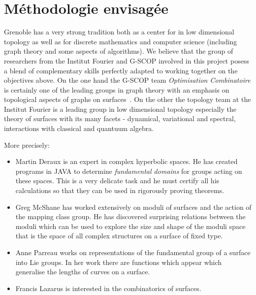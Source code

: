 \documentclass[14pt,fleqn]{article}
\begin{document}
\section{Méthodologie envisagée}

Grenoble  has 
a very strong tradition both 
as a center for in low dimensional topology 
as well as for discrete mathematics and computer science
(including graph theory and some aspects of algorithms). 
We believe that the group of researchers from the Institut Fourier and G-SCOP 
involved
in this project posess a blend of complementary skills 
perfectly adapted
to working together on the objectives above.
On the one hand the G-SCOP team \emph{Optimisation Combinatoire} is certainly one of the leading groups in graph theory with an emphasis on topological aspects of graphs on surfaces~\cite{es-wqpp-18}. On the other the topology team at the Institut Fourier is a leading group in low dimensional topology 
especially the theory of surfaces 
with its many facets 
- dynamical, variational and spectral,
 interactions with classical and quantuum algebra.
 
More precisely:
\begin{itemize}
\item Martin Deraux is an expert in complex hyperbolic spaces. He has created programs in JAVA to determine 
\textit{fundamental domains} for groups acting on these spaces. This is a very delicate task and he must certify all his calculations so that they can be used in rigorously proving theorems.
\item Greg McShane has worked extensively on moduli of surfaces and the action of the mapping class group. He has discovered surprising relations between the moduli which can be used to explore the size and shape of the moduli space that is the space of all complex structures on a surface of fixed type.
\item Anne Parreau works on representations of the fundamental group of a surface into Lie groups. 
In her work there are functions which appear which generalise the lengths of curves on a surface.
\item Francis Lazarus is interested in the combinatorics of surfaces.

\end{itemize}
\end{document}
